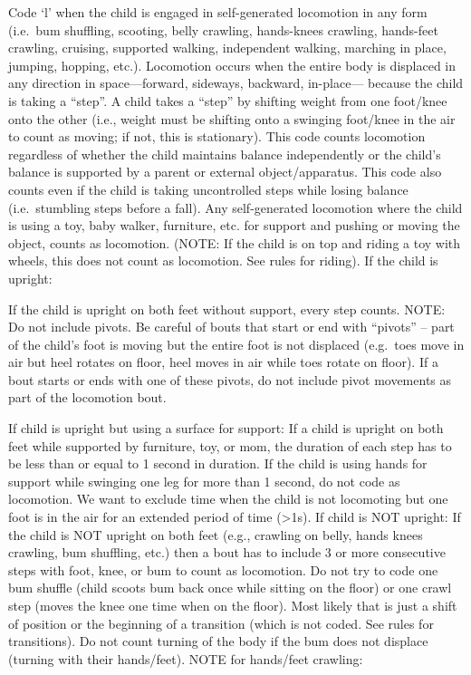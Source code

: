 \documentclass[
]{book}
\begin{document}
Code `l' when the child is engaged in self-generated locomotion in any form (i.e.~bum shuffling, scooting, belly crawling, hands-knees crawling, hands-feet crawling, cruising, supported walking, independent walking, marching in place, jumping, hopping, etc.). Locomotion occurs when the entire body is displaced in any direction in space---forward, sideways, backward, in-place--- because the child is taking a ``step''. A child takes a ``step'' by shifting weight from one foot/knee onto the other (i.e., weight must be shifting onto a swinging foot/knee in the air to count as moving; if not, this is stationary).
This code counts locomotion regardless of whether the child maintains balance independently or the child's balance is supported by a parent or external object/apparatus. This code also counts even if the child is taking uncontrolled steps while losing balance (i.e.~stumbling steps before a fall). Any self-generated locomotion where the child is using a toy, baby walker, furniture, etc. for support and pushing or moving the object, counts as locomotion. (NOTE: If the child is on top and riding a toy with wheels, this does not count as locomotion. See rules for riding).
If the child is upright:

If the child is upright on both feet without support, every step counts.
NOTE: Do not include pivots. Be careful of bouts that start or end with ``pivots'' -- part of the child's foot is moving but the entire foot is not displaced (e.g.~toes move in air but heel rotates on floor, heel moves in air while toes rotate on floor). If a bout starts or ends with one of these pivots, do not include pivot movements as part of the locomotion bout.

If child is upright but using a surface for support:
If a child is upright on both feet while supported by furniture, toy, or mom, the duration of each step has to be less than or equal to 1 second in duration. If the child is using hands for support while swinging one leg for more than 1 second, do not code as locomotion. We want to exclude time when the child is not locomoting but one foot is in the air for an extended period of time (\textgreater1s).
If child is NOT upright:
If the child is NOT upright on both feet (e.g., crawling on belly, hands knees crawling, bum shuffling, etc.) then a bout has to include 3 or more consecutive steps with foot, knee, or bum to count as locomotion. Do not try to code one bum shuffle (child scoots bum back once while sitting on the floor) or one crawl step (moves the knee one time when on the floor). Most likely that is just a shift of position or the beginning of a transition (which is not coded. See rules for transitions). Do not count turning of the body if the bum does not displace (turning with their hands/feet).
NOTE for hands/feet crawling:
\end{document}
